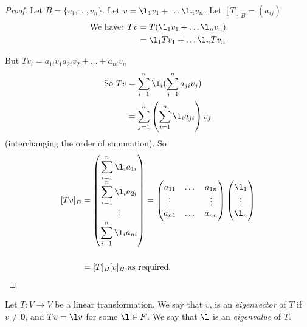 \documentclass[twoside]{scrartcl}
\begin{document}
\begin{proof}
Let $B = \{v_1,\dots,v_n\}$. Let $v = \l_1v_1 + \dots \l_nv_n$. Let $[T]_B = (a_{ij})$\\
\[
\begin{aligned}
\text{We  have: } Tv &= T(\l_1v_1 + \dots \l_nv_n) \\
& = \l_1Tv_1 + \dots \l_nTv_n
\end{aligned}\]

But $Tv_i = a_{1i}v_1 a_{2i}v_2 + \dots + a_{ni}v_n$\\
 \[\begin{aligned}
\text{So } Tv &= \sum_{i = 1}^{n} \l_i(\sum_{j = 1}^n a_{ji}v_j) \\
&= \sum_{j = 1}^n \left(\sum_{i=1}^n \l_i a_{ji}\right) v_j
\end{aligned}\]
(interchanging the order of summation).
So  \[
\begin{aligned}
[Tv]_B &= \begin{pmatrix}
 \displaystyle{\sum_{i=1}^n \l_i a_{1i}}\\
 \displaystyle{\sum_{i=1}^n \l_i a_{2i}}\\
 \vdots \\
\displaystyle{ \sum_{i=1}^n \l_i a_{ni} }
 \end{pmatrix}
 = 
 \begin{pmatrix}
 a_{11} & \dots & a_{1n} \\
 \vdots & & \vdots \\
 a_{n1} & \dots & a_{nn} 
 \end{pmatrix}
 \begin{pmatrix}
 \l_1 \\ \vdots \\ \l_n
 \end{pmatrix} \\\\
   &= [T]_B[v]_B \text{ as required.}
  \end{aligned}
\]
\end{proof}

\pagebreak

\vspace*{5pt}

\begin{definition} 
 Let $T: V \to V$ be a linear transformation. We say that $v$, is an \emph{eigenvector} of $T$ if $v \neq \mathbf{0}$, and $Tv = \l v$ for some $\l \in F$. We say that $\l$ is an \emph{eigenvalue} of $T$.\end{definition}\vspace*{10pt}
\end{document}
